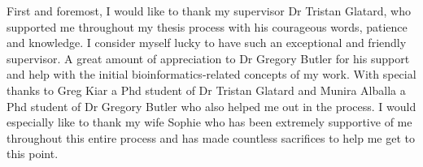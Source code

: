 \begin{acknowledgments}

    First and foremost, I would like to thank my supervisor Dr Tristan Glatard, who supported me 
    throughout my thesis process with his courageous words, patience and knowledge. I consider myself 
    lucky to have such an exceptional and friendly supervisor. A great amount of appreciation to 
    Dr Gregory Butler for his support and help with the initial bioinformatics-related concepts 
    of my work.
    With special thanks to Greg Kiar a Phd student of Dr Tristan Glatard and Munira Alballa a Phd student 
    of Dr Gregory Butler who also helped me out in the process. I would especially like to thank my wife Sophie 
    who has been extremely supportive of me throughout this entire process and has made countless 
    sacrifices to help me get to this point.
    
\end{acknowledgments}